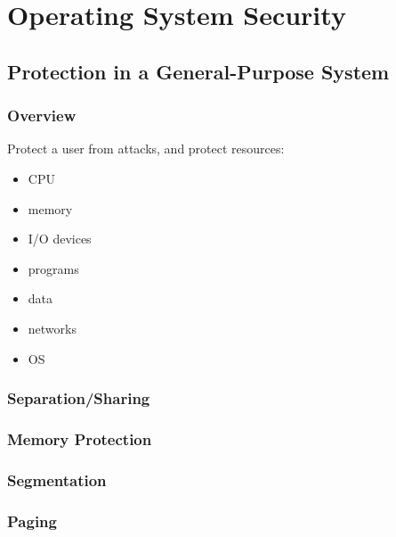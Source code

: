 \documentclass[]{article}
\theoremstyle{definition}
\begin{document}
	\section{Operating System Security}
	\subsection{Protection in a General-Purpose System}
	\subsubsection{Overview}
	Protect a user from attacks, and protect resources:
	\begin{itemize}
		\item CPU
		\item memory
		\item I/O devices
		\item programs
		\item data
		\item networks
		\item OS
	\end{itemize}

	\subsubsection{Separation/Sharing}
	\subsubsection{Memory Protection}
	\subsubsection{Segmentation}
	\subsubsection{Paging}
\end{document}

